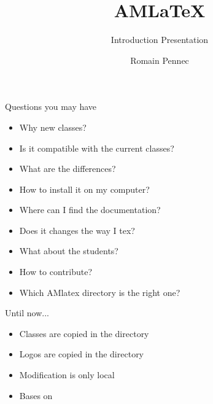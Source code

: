 \documentclass[handout]{AMbeamer}
\title{AM\LaTeX}
\subtitle{Introduction Presentation}
\author{Romain Pennec}
\begin{document}
\maketitle

\begin{frame}{Questions you may have}

\begin{itemize}
\item Why new classes?
\item Is it compatible with the current classes?
\item What are the differences?
\item How to install it on my computer?
\item Where can I find the documentation?
\item Does it changes the way I tex?
\item What about the students?
\item How to contribute?
\item Which AMlatex directory is the right one?
\end{itemize}

\end{frame}


\begin{frame}{Until now...}

\parbox{0.4\textwidth}{
}
%
\hfill
\parbox{0.5\textwidth}{
\begin{itemize}
\item Classes are copied in the directory
\item Logos are copied in the directory
\item Modification is only local
\item Bases on 
\end{itemize}
}


\end{frame}
\end{document}
